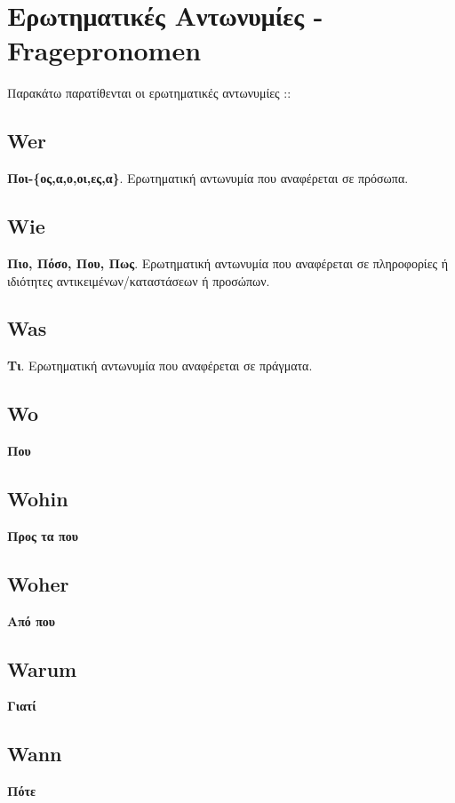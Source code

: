 

\section{Ερωτηματικές Αντωνυμίες - Fragepronomen}

Παρακάτω παρατίθενται οι ερωτηματικές αντωνυμίες ::

\subsection{Wer}

\textbf{Ποι-\{ος,α,ο,οι,ες,α\}}. Ερωτηματική αντωνυμία που αναφέρεται σε πρόσωπα. \\ 

\subsection{Wie}

\textbf{Πιο, Πόσο, Που, Πως}. Ερωτηματική αντωνυμία που αναφέρεται σε πληροφορίες ή ιδιότητες αντικειμένων/καταστάσεων ή προσώπων. \\ 

\subsection{Was}

\textbf{Τι}. Ερωτηματική αντωνυμία που αναφέρεται σε πράγματα. \\ 

\subsection{Wo}

\textbf{Που}

\subsection{Wohin}

\textbf{Προς τα που}

\subsection{Woher}

\textbf{Από που}

\subsection{Warum}

\textbf{Γιατί}

\subsection{Wann}

\textbf{Πότε}

